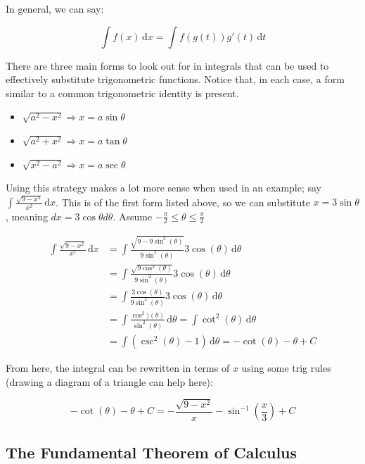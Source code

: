 \documentclass[12pt]{article}
\begin{document}
In general, we can say:

$$
\int f(x) \,\text{d}x = \int f(g(t)) g'(t) \,\text{d}t
$$

There are three main forms to look out for in integrals that can be used to effectively substitute trigonometric functions. Notice that, in each case, a form similar to a common trigonometric identity is present.

\begin{itemize}
    \item $\sqrt{a^2-x^2}  \Rightarrow x = a \sin \theta $ 
    
    \item $\sqrt{a^2+x^2} \Rightarrow x = a \tan \theta$
    
    \item $\sqrt{x^2-a^2} \Rightarrow x = a \sec \theta$
\end{itemize}

Using this strategy makes a lot more sense when used in an example; say $\int \frac{\sqrt{9-x^2}}{x^2} \,\text{d}x$. This is of the first form listed above, so we can substitute $x=3\sin \theta$, meaning $dx = 3\cos\theta d\theta$. Assume $-\frac{\pi}{2} \leq \theta \leq \frac{\pi}{2}$

\begin{equation}
    \begin{split}
        \int \frac{\sqrt{9-x^2}}{x^2}\,\text{d}x &= \int \frac{\sqrt{9-9\sin^2(\theta)}}{9\sin^2(\theta)}3\cos(\theta)\,\text{d}\theta\\
        &= \int \frac{\sqrt{9\cos^2(\theta)}}{9\sin^2(\theta)}3\cos(\theta)\,\text{d}\theta\\
        &= \int \frac{3\cos(\theta)}{9\sin^2(\theta)}3\cos(\theta)\,\text{d}\theta\\
        &= \int \frac{\cos^2)(\theta)}{\sin^2(\theta)}\,\text{d}\theta = \int \cot^2(\theta)\,\text{d}\theta\\
        &= \int (\csc^2(\theta)-1)\,\text{d}\theta = -\cot(\theta) -\theta + C
    \end{split}
\end{equation}

From here, the integral can be rewritten in terms of $x$ using some trig rules (drawing a diagram of a triangle can help here):

$$-\cot(\theta)-\theta + C = -\frac{\sqrt{9-x^2}}{x}-\sin^{-1}(\frac{x}{3})+C$$
\subsection{The Fundamental Theorem of Calculus}
\end{document}
